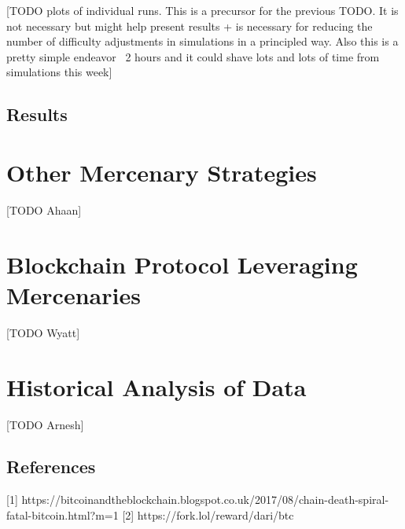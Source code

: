 \documentclass[10pt, preprint]{aastex}
\begin{document}
[TODO plots of individual runs.  This is a precursor for the previous TODO.  It is not necessary but might help present results + is necessary for reducing the number of difficulty adjustments in simulations in a principled way.  Also this is a pretty simple endeavor ~2 hours and it could shave lots and lots of time from simulations this week]
\subsection{Results}


\section{Other Mercenary Strategies}
[TODO Ahaan]


\section{Blockchain Protocol Leveraging Mercenaries}

[TODO Wyatt]

\section{Historical Analysis of Data}
[TODO Arnesh]



\subsection{References}
[1] https://bitcoinandtheblockchain.blogspot.co.uk/2017/08/chain-death-spiral-fatal-bitcoin.html?m=1
[2] https://fork.lol/reward/dari/btc
\end{document}
